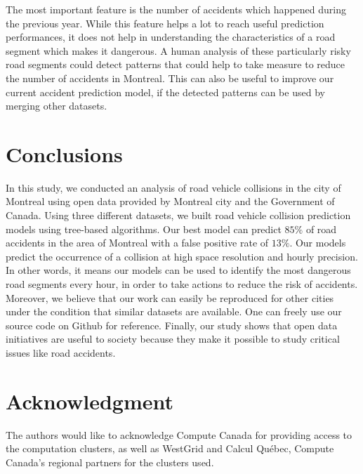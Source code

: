 \documentclass[conference]{IEEEtran}
\begin{document}
The most important feature is the number of accidents which happened during
the previous year. While this feature helps a lot to reach useful prediction
performances, it does not help in understanding the characteristics of a
road segment which makes it dangerous. A human analysis of these
particularly risky road segments could detect patterns that could help to
take measure to reduce the number of accidents in Montreal. This can also
be useful to improve our current accident prediction model, if the detected
patterns can be used by merging other datasets.


\section{Conclusions}

In this study, we conducted an analysis of road vehicle collisions in the
city of Montreal using open data provided by Montreal city and the Government of Canada. 
Using three different datasets, we built road vehicle collision
prediction models using tree-based algorithms. Our best model can predict $85\%$ of road accidents in the area of Montreal with a false positive rate of $13\%$.
Our models predict the occurrence of a collision at high space resolution and hourly precision. In other words, it
means our models can be used to identify the most dangerous road
segments every hour, in order to take actions to reduce the risk of accidents. 
Moreover, we believe that our work
can easily be reproduced for other cities under the condition that similar 
datasets are available. One can freely use our source code on Github for reference.
Finally, our study shows that open data initiatives are useful to society because they make it possible to study critical issues like road
accidents.


\section*{Acknowledgment}

The authors would like to acknowledge Compute Canada for providing access to the computation clusters, as well as WestGrid and Calcul Québec, Compute Canada's regional partners for the clusters used.



\end{document}
